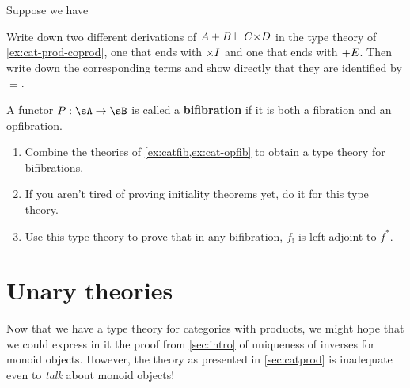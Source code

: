 \begin{ex}\label{ex:cat-prod-coprod-uniq}
  Suppose we have
  Write down two different derivations of $A+B\types C\times D$ in the type theory of \cref{ex:cat-prod-coprod}, one that ends with $\timesI$ and one that ends with $\mathord{+}E$.
  Then write down the corresponding terms and show directly that they are identified by $\equiv$.
\end{ex}

\begin{ex}\label{ex:cat-bifib}
  A functor $P:\sA\to\sB$ is called a \textbf{bifibration} if it is both a fibration and an opfibration.
  \begin{enumerate}
  \item Combine the theories of \cref{ex:catfib,ex:cat-opfib} to obtain a type theory for bifibrations.
  \item If you aren't tired of proving initiality theorems yet, do it for this type theory.
  \item Use this type theory to prove that in any bifibration, $f_!$ is left adjoint to $f^*$.
  \end{enumerate}
\end{ex}


\section{Unary theories}
\label{sec:unary-theories}


Now that we have a type theory for categories with products, we might hope that we could express in it the proof from \cref{sec:intro} of uniqueness of inverses for monoid objects.
However, the theory as presented in \cref{sec:catprod} is inadequate even to \emph{talk} about monoid objects!

